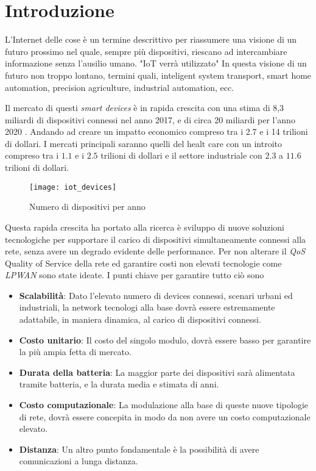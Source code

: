 \chapter*{Introduzione}

L'Internet delle cose è un termine descrittivo per riassumere una visione di
un futuro prossimo nel quale, sempre più dispositivi, riescano ad intercambiare
informazione senza l'ausilio umano. "IoT verrà utilizzato" In questa visione di 
un futuro non troppo lontano, termini quali, inteligent system transport, 
smart home automation, precision agriculture\cite{PAgricolture}, industrial 
automation, ecc.

Il mercato di questi \emph{smart devices } è
in rapida crescita con una stima di 8,3 miliardi di dispositivi connessi nel
anno 2017, e di circa 20 miliardi per l'anno 2020 \cite{gartner2016}. Andando ad
creare un impatto economico compreso tra i 2.7 e i 14 trilioni di dollari. I
mercati principali saranno quelli del healt care con un introito compreso tra i
$1.1$ e i $2.5$ trilioni di dollari e il settore industriale con $2.3$ a $11.6$
trilioni di dollari.

\begin{figure}[h]
\centering 
\texttt{[image: iot\_devices]}
\caption{Numero di dispositivi per anno}
\end{figure}

Questa rapida crescita ha portato alla ricerca è sviluppo di nuove soluzioni 
tecnologiche per supportare il carico di dispositivi simultaneamente connessi 
alla rete, senza avere un degrado evidente delle performance.
Per non alterare il \emph{QoS} Quality of Service della rete ed garantire costi
non elevati tecnologie come \emph{LPWAN} sono state ideate. I punti chiave per
garantire tutto ciò sono
\begin{itemize}
\item \textbf{Scalabilità}: Dato l'elevato numero di devices connessi, scenari
urbani ed industriali, la network tecnologi alla base dovrà essere estremamente
adattabile, in maniera dinamica, al carico di dispositivi connessi.
\item \textbf{Costo unitario}: Il costo del singolo modulo, dovrà essere basso
per garantire la più ampia fetta di mercato.
\item \textbf{Durata della batteria}: La maggior parte dei dispositivi sarà
alimentata tramite batteria, e la durata media e stimata di anni. 
\item \textbf{Costo computazionale}: La modulazione alla base di queste nuove
tipologie di rete, dovrà essere concepita in modo da non avere un costo
computazionale elevato.
\item \textbf{Distanza}: Un altro punto fondamentale è la possibilità di avere
comunicazioni a lunga distanza.
\end{itemize}

